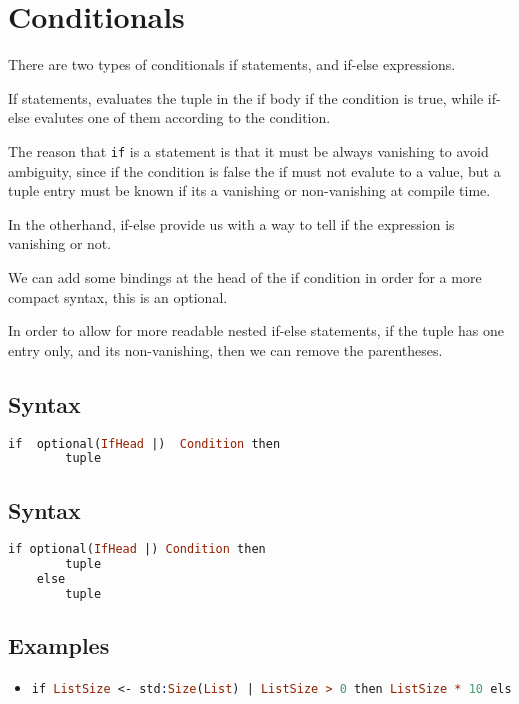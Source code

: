 \section{Conditionals}

There are two types of conditionals if statements, and if-else
expressions.

If statements, evaluates the tuple in the if body if the condition is
true, while if-else evalutes one of them according to the condition.

The reason that \texttt{if} is a statement is that it must be always
vanishing to avoid ambiguity, since if the condition is false the if
must not evalute to a value, but a tuple entry must be known if its a
vanishing or non-vanishing at compile time.

In the otherhand, if-else provide us with a way to tell if the
expression is vanishing or not.

We can add some bindings at the head of the if condition in order for
a more compact syntax, this is an optional.

In order to allow for more readable nested if-else statements, if the tuple
has one entry only, and its non-vanishing, then we can remove the parentheses.

\subsection{Syntax}
\begin{lstlisting}[language =Prolog]
    if  optional(IfHead |)  Condition then 
        tuple
\end{lstlisting}

\subsection{Syntax}

\begin{lstlisting}[language =Prolog]
    if optional(IfHead |) Condition then 
        tuple
    else 
        tuple
\end{lstlisting}

\subsection{Examples}

\begin{itemize}

	\item  \begin{lstlisting}[language =Prolog]
                if ListSize <- std:Size(List) | ListSize > 0 then ListSize * 10 else ListSize
            \end{lstlisting}
\end{itemize}


